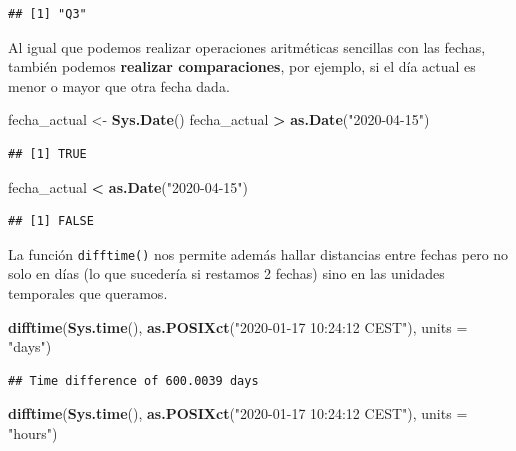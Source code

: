 \documentclass[11pt,]{book}
\newenvironment{Shaded}{\begin{snugshade}}{\end{snugshade}}
\newcommand{\DataTypeTok}[1]{\textcolor[rgb]{0.27,0.27,0.27}{#1}}
\newcommand{\KeywordTok}[1]{\textcolor[rgb]{0.27,0.27,0.27}{\textbf{#1}}}
\newcommand{\NormalTok}[1]{#1}
\newcommand{\OperatorTok}[1]{\textcolor[rgb]{0.43,0.43,0.43}{\textbf{#1}}}
\newcommand{\StringTok}[1]{\textcolor[rgb]{0.5,0.5,0.5}{#1}}
\begin{document}
\begin{verbatim}
## [1] "Q3"
\end{verbatim}

Al igual que podemos realizar operaciones aritméticas sencillas con las fechas, también podemos \textbf{realizar comparaciones}, por ejemplo, si el día actual es menor o mayor que otra fecha dada.

\begin{Shaded}
\begin{Highlighting}[]
\NormalTok{fecha_actual <-}\StringTok{ }\KeywordTok{Sys.Date}\NormalTok{()}
\NormalTok{fecha_actual }\OperatorTok{>}\StringTok{ }\KeywordTok{as.Date}\NormalTok{(}\StringTok{"2020-04-15"}\NormalTok{)}
\end{Highlighting}
\end{Shaded}

\begin{verbatim}
## [1] TRUE
\end{verbatim}

\begin{Shaded}
\begin{Highlighting}[]
\NormalTok{fecha_actual }\OperatorTok{<}\StringTok{ }\KeywordTok{as.Date}\NormalTok{(}\StringTok{"2020-04-15"}\NormalTok{)}
\end{Highlighting}
\end{Shaded}

\begin{verbatim}
## [1] FALSE
\end{verbatim}

La función \texttt{difftime()} nos permite además hallar distancias entre fechas pero no solo en días (lo que sucedería si restamos 2 fechas) sino en las unidades temporales que queramos.

\begin{Shaded}
\begin{Highlighting}[]
\KeywordTok{difftime}\NormalTok{(}\KeywordTok{Sys.time}\NormalTok{(), }\KeywordTok{as.POSIXct}\NormalTok{(}\StringTok{"2020-01-17 10:24:12 CEST"}\NormalTok{), }\DataTypeTok{units =} \StringTok{"days"}\NormalTok{)}
\end{Highlighting}
\end{Shaded}

\begin{verbatim}
## Time difference of 600.0039 days
\end{verbatim}

\begin{Shaded}
\begin{Highlighting}[]
\KeywordTok{difftime}\NormalTok{(}\KeywordTok{Sys.time}\NormalTok{(), }\KeywordTok{as.POSIXct}\NormalTok{(}\StringTok{"2020-01-17 10:24:12 CEST"}\NormalTok{), }\DataTypeTok{units =} \StringTok{"hours"}\NormalTok{)}
\end{Highlighting}
\end{Shaded}
\end{document}
